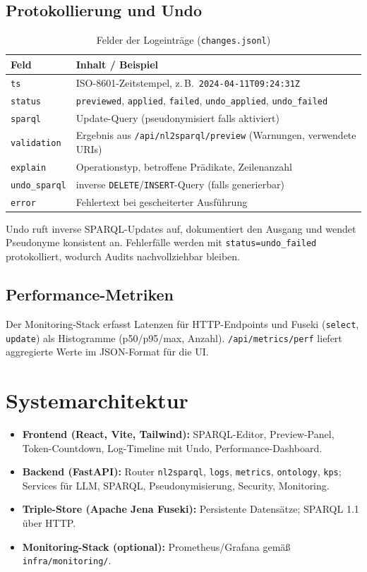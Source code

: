 \subsection{Protokollierung und Undo}
\begin{table}[ht]
  \centering
  \caption{Felder der Logeinträge (\texttt{changes.jsonl})}
  \label{tab:logging-fields}
  \begin{tabular}{p{}p{}}
    \toprule
    \textbf{Feld} & \textbf{Inhalt / Beispiel} \\
    \midrule
    \texttt{ts} & ISO-8601-Zeitstempel, z.\,B.\ \texttt{2024-04-11T09:24:31Z} \\
    \texttt{status} & \texttt{previewed}, \texttt{applied}, \texttt{failed}, \texttt{undo\_applied}, \texttt{undo\_failed} \\
    \texttt{sparql} & Update-Query (pseudonymisiert falls aktiviert) \\
    \texttt{validation} & Ergebnis aus \texttt{/api/nl2sparql/preview} (Warnungen, verwendete URIs) \\
    \texttt{explain} & Operationstyp, betroffene Prädikate, Zeilenanzahl \\
    \texttt{undo\_sparql} & inverse \texttt{DELETE}/\texttt{INSERT}-Query (falls generierbar) \\
    \texttt{error} & Fehlertext bei gescheiterter Ausführung \\
    \bottomrule
  \end{tabular}
\end{table}

Undo ruft inverse SPARQL-Updates auf, dokumentiert den Ausgang und wendet Pseudonyme konsistent an. Fehlerfälle werden mit \texttt{status=undo\_failed} protokolliert, wodurch Audits nachvollziehbar bleiben.

\subsection{Performance-Metriken}
Der Monitoring-Stack erfasst Latenzen für HTTP-Endpoints und Fuseki (\texttt{select}, \texttt{update}) als Histogramme (p50/p95/max, Anzahl). \texttt{/api/metrics/perf} liefert aggregierte Werte im JSON-Format für die UI.

\section{Systemarchitektur}
\label{subsec:arch-backend}
\begin{itemize}
  \item \textbf{Frontend (React, Vite, Tailwind):} SPARQL-Editor, Preview-Panel, Token-Countdown, Log-Timeline mit Undo, Performance-Dashboard.
  \item \textbf{Backend (FastAPI):} Router \texttt{nl2sparql}, \texttt{logs}, \texttt{metrics}, \texttt{ontology}, \texttt{kps}; Services für LLM, SPARQL, Pseudonymisierung, Security, Monitoring.
  \item \textbf{Triple-Store (Apache Jena Fuseki):} Persistente Datensätze; SPARQL 1.1 über HTTP.
  \item \textbf{Monitoring-Stack (optional):} Prometheus/Grafana gemäß \texttt{infra/monitoring/}.
\end{itemize}

